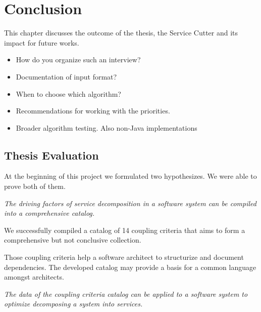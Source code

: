 \chapter{Conclusion}

This chapter discusses the outcome of the thesis, the Service Cutter and its impact for future works.

\begin{itemize}
\item How do you organize such an interview?
\item Documentation of input format?
\item When to choose which algorithm?
\item Recommendations for working with the priorities.
\item Broader algorithm testing. Also non-Java implementations
\end{itemize}


\section{Thesis Evaluation}

At the beginning of this project we formulated two hypothesizes. We were able to prove both of them.

\textit{The driving factors of service decomposition in a software system can be compiled into a comprehensive catalog.}

We successfully compiled a catalog of 14 coupling criteria that aims to form a comprehensive but not conclusive collection. 

Those coupling criteria help a software architect to structurize and document dependencies. The developed catalog may provide a basis for a common language amongst architects. 


\textit{The data of the coupling criteria catalog can be applied to a software system to optimize decomposing a system into services.}


